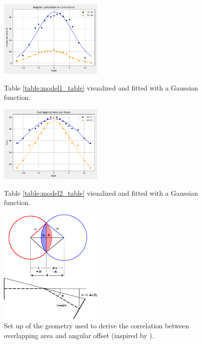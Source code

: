 \documentclass[../final_report_main.tex]{subfiles}
\begin{document}
\begin{figure}[H]
    \centering
    \includegraphics[width=0.45\textwidth]{Figures/coincidence_gauss_fit.png}
    \caption{Table \ref{table:model1_table} visualized and fitted with a Gaussian
    function.}
    \label{figure:model1_graph}
    \includegraphics[width=0.45\textwidth]{Figures/overlapping_area_gauss_fit.png}
    \caption{Table \ref{table:model2_table} visualized and fitted with a Gaussian
    function.}
    \label{figure:model2_graph}
    \includegraphics[width=0.45\textwidth]{Figures/geometry.jpg}
    \caption{Set up of the geometry used to derive the correlation between
    overlapping area and angular offset (inspired by \cite{Geometry}).}
    \label{figure:geometry}
\end{figure}
\end{document}
